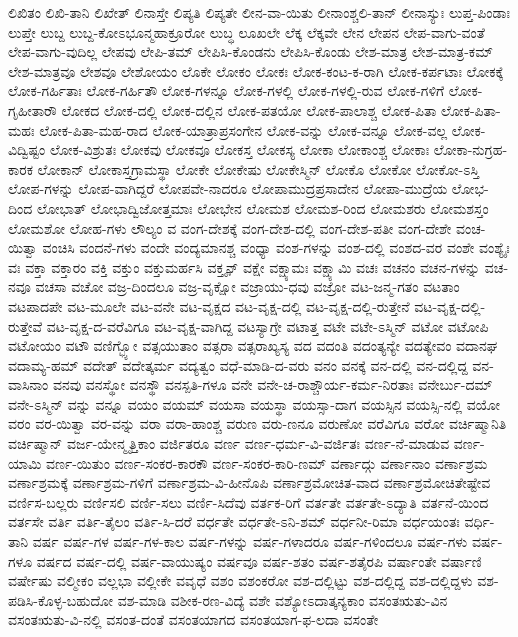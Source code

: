 {ಲಿಖಿತಂ
ಲಿಖಿ-ತಾನಿ
ಲಿಖೇತ್
ಲಿನಾಸ್ತೇ
ಲಿಪ್ಯತಿ
ಲಿಪ್ಯತೇ
ಲೀನ-ವಾ-ಯಿತು
ಲೀನಾಂಶ್ಚಲಿ-ತಾನ್
ಲೀನಾಸ್ಯುಃ
ಲುಪ್ತ-ಪಿಂಡಾಃ
ಲುಪ್ತೇ
ಲುಬ್ದ
ಲುಬ್ದ-ಕೋಽಭೂನ್ಮಹಾಕ್ರೂರೋ
ಲುಬ್ಧ
ಲೂಖಲೇ
ಲೆಕ್ಕ
ಲೆಕ್ಕವೇ
ಲೇನ
ಲೇಪನ
ಲೇಪ-ವಾಗು-ವಂತೆ
ಲೇಪ-ವಾಗು-ವುದಿಲ್ಲ
ಲೇಪವು
ಲೇಪಿ-ತಮ್
ಲೇಪಿಸಿ-ಕೊಂಡನು
ಲೇಪಿಸಿ-ಕೊಂಡು
ಲೇಶ-ಮಾತ್ರ
ಲೇಶ-ಮಾತ್ರ-ಕಮ್
ಲೇಶ-ಮಾತ್ರವೂ
ಲೇಶವೂ
ಲೇಶೋಯಂ
ಲೊಕೇ
ಲೋಕಂ
ಲೋಕಃ
ಲೋಕ-ಕಂಟ-ಕ-ರಾಗಿ
ಲೋಕ-ಕರ್ಪಟಾಃ
ಲೋಕಕ್ಕೆ
ಲೋಕ-ಗರ್ಹಿತಾಃ
ಲೋಕ-ಗರ್ಹಿತೌ
ಲೋಕ-ಗಳನ್ನೂ
ಲೋಕ-ಗಳಲ್ಲಿ
ಲೋಕ-ಗಳಲ್ಲಿ-ರುವ
ಲೋಕ-ಗಳಿಗೆ
ಲೋಕ-ಗೃಹೀತಾರೌ
ಲೋಕದ
ಲೋಕ-ದಲ್ಲಿ
ಲೋಕ-ದಲ್ಲಿನ
ಲೋಕ-ಪತಯೋ
ಲೋಕ-ಪಾಲಾಶ್ಚ
ಲೋಕ-ಪಿತಾ
ಲೋಕ-ಪಿತಾ-ಮಹಃ
ಲೋಕ-ಪಿತಾ-ಮಹ-ರಾದ
ಲೋಕ-ಯಾತ್ರಾಪ್ರಸಂಗೇನ
ಲೋಕ-ವನ್ನು
ಲೋಕ-ವನ್ನೂ
ಲೋಕ-ವಲ್ಲ
ಲೋಕ-ವಿದ್ವಿಷ್ಟಂ
ಲೋಕ-ವಿಶ್ರುತಃ
ಲೋಕವು
ಲೋಕವೂ
ಲೋಕಸ್ತ
ಲೋಕಸ್ಯ
ಲೋಕಾ
ಲೋಕಾಂಶ್ಚ
ಲೋಕಾಃ
ಲೋಕಾ-ನುಗ್ರಹ-ಕಾರಕ
ಲೋಕಾನ್
ಲೋಕಾಸ್ತಗ್ರಾಮಸ್ಥಾ
ಲೋಕೇ
ಲೋಕೇಷು
ಲೋಕೇಸ್ಮಿನ್
ಲೋಕೊ
ಲೋಕೋ
ಲೋಕೋ-ಽಸ್ತಿ
ಲೋಪ-ಗಳನ್ನು
ಲೋಪ-ವಾಗಿದ್ದರೆ
ಲೋಪವೇ-ನಾದರೂ
ಲೋಪಾಮುದ್ರಪ್ರಸಾದೇನ
ಲೋಪಾ-ಮುದ್ರೆಯ
ಲೋಭ-ದಿಂದ
ಲೋಭಾತ್
ಲೋಭಾದ್ವಿಜೋತ್ತಮಾಃ
ಲೋಭೇನ
ಲೋಮಶ
ಲೋಮಶ-ರಿಂದ
ಲೋಮಶರು
ಲೋಮಶಸ್ತಂ
ಲೋಮಶೋ
ಲೋಹ-ಗಳು
ಲೌಲ್ಯಂ
ವ
ವಂಗ-ದೇಶಕ್ಕೆ
ವಂಗ-ದೇಶ-ದಲ್ಲಿ
ವಂಗ-ದೇಶ-ಪತೀ
ವಂಗ-ದೇಶೇ
ವಂಚ-ಯಿತ್ವಾ
ವಂಚಿಸಿ
ವಂದನೆ-ಗಳು
ವಂದೇ
ವಂದ್ಯಮಾನಶ್ಚ
ವಂಧ್ಯಾ
ವಂಶ-ಗಳನ್ನು
ವಂಶ-ದಲ್ಲಿ
ವಂಶದ-ವರ
ವಂಶೇ
ವಂಶ್ಯೈಃ
ವಃ
ವಕ್ತಾ
ವಕ್ತಾರಂ
ವಕ್ತಿ
ವಕ್ತುಂ
ವಕ್ತುಮರ್ಹಸಿ
ವಕ್ತೄನ್
ವಕ್ಷೇ
ವಕ್ಷ್ಯಾಮಃ
ವಕ್ಷ್ಯಾಮಿ
ವಚಃ
ವಚನಂ
ವಚನ-ಗಳನ್ನು
ವಚ-ನವೂ
ವಚಸಾ
ವಚೋ
ವಜ್ರ-ದಿಂದಲೂ
ವಜ್ರ-ವೃಕ್ಷೋ
ವಜ್ರಾಯು-ಧವು
ವಜ್ರೋ
ವಟ-ಜನ್ಮ-ಗತಂ
ವಟತಾಂ
ವಟಪಾದಪೇ
ವಟ-ಮೂಲೇ
ವಟ-ವನೇ
ವಟ-ವೃಕ್ಷದ
ವಟ-ವೃಕ್ಷ-ದಲ್ಲಿ
ವಟ-ವೃಕ್ಷ-ದಲ್ಲಿ-ರುತ್ತೇನೆ
ವಟ-ವೃಕ್ಷ-ದಲ್ಲಿ-ರುತ್ತೇವೆ
ವಟ-ವೃಕ್ಷ-ದ-ವರೆವಿಗೂ
ವಟ-ವೃಕ್ಷ-ವಾಗಿದ್ದ
ವಟಸ್ಯಾಗ್ರೇ
ವಟಾತ್ತ
ವಟೇ
ವಟೇ-ಽಸ್ಮಿನ್
ವಟೋ
ವಟೋಪಿ
ವಟೋಯಂ
ವಟೌ
ವಣಿಗ್ಭ್ಯೋ
ವತ್ಸಯುತಾಂ
ವತ್ಸರಾ
ವತ್ಸರಾಖ್ಯಸ್ಯ
ವದ
ವದಂತಿ
ವದಂತ್ಯನ್ಯೇ
ವದತ್ಯೇವಂ
ವದಾನಘ
ವದಾಮ್ಯ-ಹಮ್
ವದೇತ್
ವದೇತ್ಕರ್ಮ
ವದ್ಯತ್ವಂ
ವಧೆ-ಮಾಡಿ-ದ-ವರು
ವನಂ
ವನಕ್ಕೆ
ವನ-ದಲ್ಲಿ
ವನ-ದಲ್ಲಿದ್ದ
ವನ-ವಾಸಿನಾಂ
ವನವು
ವನಸ್ಥೋ
ವನಸ್ಥೌ
ವನಸ್ಪತಿ-ಗಳೂ
ವನೇ
ವನೇ-ಚ-ರಾಶ್ಚೌರ್ಯ-ಕರ್ಮ-ನಿರತಾಃ
ವನೇರ್ಬು-ದಮ್
ವನೇ-ಽಸ್ಮಿನ್
ವನ್ನು
ವನ್ನೂ
ವಯಂ
ವಯಮ್
ವಯಸಾ
ವಯಸ್ಥಾ
ವಯಸ್ಸಾ-ದಾಗ
ವಯಸ್ಸಿನ
ವಯಸ್ಸಿ-ನಲ್ಲಿ
ವಯೋ
ವರಂ
ವರ-ಯಿತ್ವಾ
ವರ-ವನ್ನು
ವರಾ
ವರಾ-ಹಾಂಶ್ಚ
ವರುಣ
ವರು-ಣನೂ
ವರುಣೋ
ವರೆವಿಗೂ
ವರೋ
ವರ್ಚಿಷ್ಮಾನಿತಿ
ವರ್ಚಿಷ್ಮಾನ್
ವರ್ಜ-ಯೇನ್ಮೃತ್ತಿಕಾಂ
ವರ್ಜಿತರೂ
ವರ್ಣ
ವರ್ಣ-ಧರ್ಮ-ವಿ-ವರ್ಜಿತಃ
ವರ್ಣ-ನೆ-ಮಾಡುವ
ವರ್ಣ-ಯಾಮಿ
ವರ್ಣ-ಯಿತುಂ
ವರ್ಣ-ಸಂಕರ-ಕಾರಕೌ
ವರ್ಣ-ಸಂಕರ-ಕಾರಿ-ಣಮ್
ವರ್ಣಾದ್ಗು
ವರ್ಣಾನಾಂ
ವರ್ಣಾಶ್ರಮ
ವರ್ಣಾಶ್ರಮಕ್ಕೆ
ವರ್ಣಾಶ್ರಮ-ಗಳಿಗೆ
ವರ್ಣಾಶ್ರಮ-ವಿ-ಹೀನೊಪಿ
ವರ್ಣಾಶ್ರಮೋಚಿತ-ವಾದ
ವರ್ಣಾಶ್ರಮೋಚಿತೇಷ್ಟೇವ
ವರ್ಣಿಸ-ಬಲ್ಲರು
ವರ್ಣಿಸಲಿ
ವರ್ಣಿ-ಸಲು
ವರ್ಣಿ-ಸಿದೆವು
ವರ್ತಕ-ರಿಗೆ
ವರ್ತತೇ
ವರ್ತತೇ-ಽದ್ಯಾತಿ
ವರ್ತನೆ-ಯಿಂದ
ವರ್ತಸೇ
ವರ್ತಿ
ವರ್ತಿ-ತೈಲಂ
ವರ್ತಿ-ಸಿ-ದರೆ
ವರ್ಧತೇ
ವರ್ಧತೇ-ಽನಿ-ಶಮ್
ವರ್ಧನೀ-ರಿಮಾ
ವರ್ಧಯಂತಃ
ವರ್ಧಿ-ತಾನಿ
ವರ್ಷ
ವರ್ಷ-ಗಳ
ವರ್ಷ-ಗಳ-ಕಾಲ
ವರ್ಷ-ಗಳನ್ನು
ವರ್ಷ-ಗಳಾದರೂ
ವರ್ಷ-ಗಳಿಂದಲೂ
ವರ್ಷ-ಗಳು
ವರ್ಷ-ಗಳೂ
ವರ್ಷದ
ವರ್ಷ-ದಲ್ಲಿ
ವರ್ಷ-ವಾಯುಷ್ಯಂ
ವರ್ಷವೂ
ವರ್ಷ-ಶತಂ
ವರ್ಷ-ಶತೈರಪಿ
ವರ್ಷಾಂತೇ
ವರ್ಷಾಣಿ
ವರ್ಷೇಷು
ವಲ್ಮೀಕಂ
ವಲ್ಲಭಾ
ವಲ್ಲೀಕೇ
ವವೃಧೆ
ವಶಂ
ವಶಂಕರೋ
ವಶ-ದಲ್ಲಿಟ್ಟು
ವಶ-ದಲ್ಲಿದ್ದ
ವಶ-ದಲ್ಲಿದ್ದಳು
ವಶ-ಪಡಿಸಿ-ಕೊಳ್ಳ-ಬಹುದೋ
ವಶ-ಮಾಡಿ
ವಶೀಕ-ರಣ-ವಿದ್ಯೆ
ವಶೇ
ವಶ್ಯೋಽದಾತ್ಕನ್ಯಕಾಂ
ವಸಂತಋತು-ವಿನ
ವಸಂತಋತು-ವಿ-ನಲ್ಲಿ
ವಸಂತ-ದಂತೆ
ವಸಂತಯಾಗದ
ವಸಂತಯಾಗ-ಫ-ಲದಾ
ವಸಂತೇ
}
